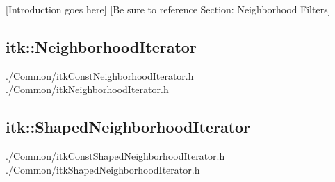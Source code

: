 [Introduction goes here]
[Be sure to reference Section: Neighborhood Filters]


\subsection{itk::NeighborhoodIterator}
\label{sec:itkNeighborhoodIterator}
./Common/itkConstNeighborhoodIterator.h
./Common/itkNeighborhoodIterator.h

\subsection{itk::ShapedNeighborhoodIterator}
\label{sec:itkShapedNeighborhoodIterator}
./Common/itkConstShapedNeighborhoodIterator.h
./Common/itkShapedNeighborhoodIterator.h






















